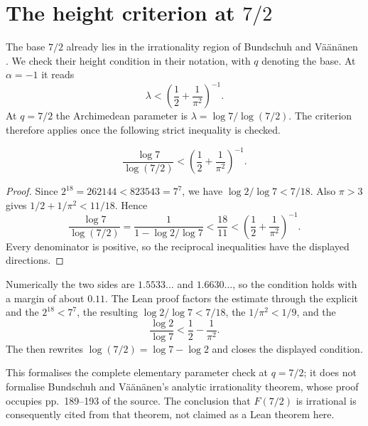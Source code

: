 \documentclass[11pt]{article}
\begin{document}
\section{The height criterion at \texorpdfstring{$7/2$}{7/2}}\label{long1049:sec:sevenhalves}

The base $7/2$ already lies in the irrationality region of
Bundschuh and V\"a\"an\"anen
\cite[Theorem~2, p.~177; hypotheses pp.~175--176]{bv1994}.
We check their height condition in their notation, with $q$
denoting the base. At $\alpha=-1$ it reads
\[
 \lambda<\left(\frac12+\frac1{\pi^2}\right)^{-1}.
\]
At $q=7/2$ the Archimedean parameter is
$\lambda=\log 7/\log(7/2)$.  The criterion therefore applies once the following
strict inequality is checked.

\begin{theorem}\label{long1049:res:sevenhalves}
\[
 \frac{\log 7}{\log(7/2)}
 <
 \left(\frac12+\frac1{\pi^2}\right)^{-1}.
\]
\end{theorem}
\begin{proof}
Since $2^{18}=262144<823543=7^7$, we have
$\log2/\log7<7/18$. Also $\pi>3$ gives
$1/2+1/\pi^2<11/18$. Hence
\[
 \frac{\log7}{\log(7/2)}
 =\frac1{1-\log2/\log7}<\frac{18}{11}
 <\left(\frac12+\frac1{\pi^2}\right)^{-1}.
\]
Every denominator is positive, so the reciprocal inequalities have
the displayed directions.
\end{proof}

\noindent Numerically the two sides are $1.5533\ldots$ and $1.6630\ldots$, so
the condition holds with a margin of about $0.11$.  The Lean proof factors the
estimate through the explicit
 and the
 $2^{18}<7^7$, the resulting
 $\log2/\log7<7/18$, the
$1/\pi^2<1/9$, and the
\[
 \frac{\log2}{\log7}<\frac12-\frac1{\pi^2}.
\]
The
 then rewrites
$\log(7/2)=\log7-\log2$ and closes the displayed condition.

This formalises the complete elementary parameter check at $q=7/2$; it does
not formalise Bundschuh and V\"a\"an\"anen's analytic irrationality theorem,
whose proof occupies pp.~189--193 of the source.  The conclusion that
$F(7/2)$ is irrational is consequently cited from that theorem, not claimed as
a Lean theorem here.
\end{document}
